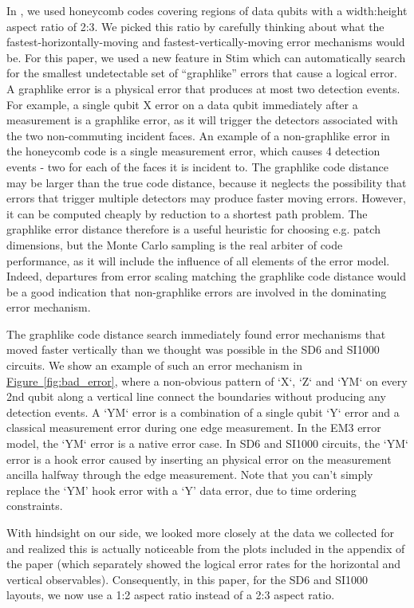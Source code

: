 \documentclass[onecolumn,a4paper,accepted=2022-09-12]{quantumarticle}
\theoremstyle{definition}
\theoremstyle{definition}
\theoremstyle{definition}
\newcommand{\fig}[1]{\hyperref[fig:#1]{Figure~\ref*{fig:#1}}}
\begin{document}
In \cite{gidney2021honeycombmemory}, we used honeycomb codes covering regions of data qubits with a width:height aspect ratio of 2:3.
We picked this ratio by carefully thinking about what the fastest-horizontally-moving and fastest-vertically-moving error mechanisms would be.
For this paper, we used a new feature in Stim which can automatically search for the smallest undetectable set of ``graphlike'' errors that cause a logical error.
A graphlike error is a physical error that produces at most two detection events.
For example, a single qubit X error on a data qubit immediately after a measurement is a graphlike error, as it will trigger the detectors associated with the two non-commuting incident faces. An example of a non-graphlike error in the honeycomb code is a single measurement error, which causes 4 detection events - two for each of the faces it is incident to.  
The graphlike code distance may be larger than the true code distance, because it neglects the possibility that errors that trigger multiple detectors may produce faster moving errors. However, it can be computed cheaply by reduction to a shortest path problem. The graphlike error distance therefore is a useful heuristic for choosing e.g. patch dimensions, but the Monte Carlo sampling is the real arbiter of code performance, as it will include the influence of all elements of the error model. Indeed, departures from error scaling matching the graphlike code distance would be a good indication that non-graphlike errors are involved in the dominating error mechanism.

The graphlike code distance search immediately found error mechanisms that moved faster vertically than we thought was possible in the SD6 and SI1000 circuits. We show an example of such an error mechanism in \fig{bad_error}, where a non-obvious pattern of `X`, `Z` and `YM` on every 2nd qubit along a vertical line connect the boundaries without producing any detection events. A `YM` error is a combination of a single qubit `Y` error and a classical measurement error during one edge measurement. In the EM3 error model, the `YM` error is a native error case. In SD6 and SI1000 circuits, the `YM` error is a hook error caused by inserting an physical error on the measurement ancilla halfway through the edge measurement. 
Note that you can't simply replace the `YM' hook error with a `Y' data error, due to time ordering constraints.

With hindsight on our side, we looked more closely at the data we collected for \cite{gidney2021honeycombmemory} and realized this is actually noticeable from the plots included in the appendix of the paper (which separately showed the logical error rates for the horizontal and vertical observables).
Consequently, in this paper, for the SD6 and SI1000 layouts, we now use a 1:2 aspect ratio instead of a 2:3 aspect ratio.
\end{document}
